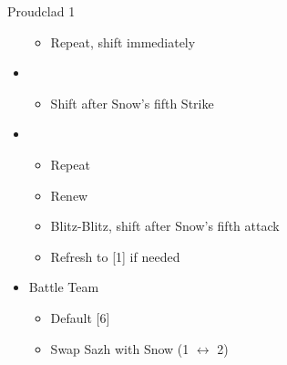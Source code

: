 \begin{battle}[1:31]{Proudclad 1}
\begin{itemize}
		      \begin{itemize}
			      \item Repeat, shift immediately
		      \end{itemize}
		\item \sixth
		      \begin{itemize}
			      \item Shift after Snow's fifth Strike
		      \end{itemize}
		\item \second
		      \begin{itemize}
			      \item Repeat
			      \item Renew
			      \item Blitz-Blitz, shift after Snow's fifth attack
			      \item Refresh to [1] if needed
		      \end{itemize}
	\end{itemize}
\end{battle}

\begin{menu}
	\begin{itemize}
		\paradigm
		\begin{itemize}
			\item Battle Team
				\begin{itemize}
					\item Default [6]
					\item Swap Sazh with Snow (1 $\leftrightarrow$ 2)
				\end{itemize}
		\end{itemize}
	\end{itemize}
\end{menu}

